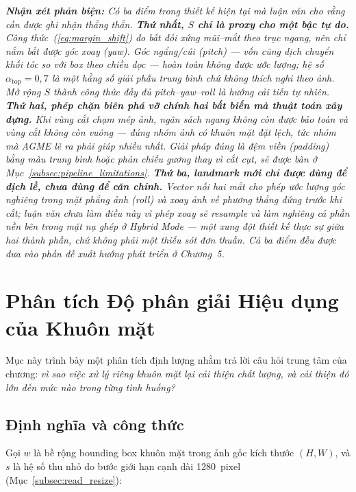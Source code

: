\medskip
\noindent\textit{\textbf{Nhận xét phản biện:} Có ba điểm trong thiết kế hiện tại mà luận văn cho rằng cần được ghi nhận thẳng thắn. \textbf{Thứ nhất, $S$ chỉ là proxy cho một bậc tự do.} Công thức~(\ref{eq:margin_shift}) đo bất đối xứng mũi--mắt theo trục ngang, nên chỉ nắm bắt được góc xoay (yaw). Góc ngẩng/cúi (pitch) --- vốn cũng dịch chuyển khối tóc so với box theo chiều dọc --- hoàn toàn không được ước lượng; hệ số $\alpha_{\text{top}} = 0{,}7$ là một hằng số giải phẫu trung bình chứ không thích nghi theo ảnh. Mở rộng $S$ thành công thức đầy đủ pitch--yaw--roll là hướng cải tiến tự nhiên. \textbf{Thứ hai, phép chặn biên phá vỡ chính hai bất biến mà thuật toán xây dựng.} Khi vùng cắt chạm mép ảnh, ngân sách ngang không còn được bảo toàn và vùng cắt không còn vuông --- đúng nhóm ảnh có khuôn mặt đặt lệch, tức nhóm mà AGME lẽ ra phải giúp nhiều nhất. Giải pháp đúng là đệm viền (padding) bằng màu trung bình hoặc phản chiếu gương thay vì cắt cụt, sẽ được bàn ở Mục~\ref{subsec:pipeline_limitations}. \textbf{Thứ ba, landmark mới chỉ được dùng để dịch lề, chưa dùng để căn chỉnh.} Vector nối hai mắt cho phép ước lượng góc nghiêng trong mặt phẳng ảnh (roll) và xoay ảnh về phương thẳng đứng trước khi cắt; luận văn chưa làm điều này vì phép xoay sẽ resample và làm nghiêng cả phần nền bên trong mặt nạ ghép ở Hybrid Mode --- một xung đột thiết kế thực sự giữa hai thành phần, chứ không phải một thiếu sót đơn thuần. Cả ba điểm đều được đưa vào phần đề xuất hướng phát triển ở Chương~5.}

\section{Phân tích Độ phân giải Hiệu dụng của Khuôn mặt}
\label{sec:effective_resolution}

Mục này trình bày một phân tích định lượng nhằm trả lời câu hỏi trung tâm của chương: \textit{vì sao việc xử lý riêng khuôn mặt lại cải thiện chất lượng, và cải thiện đó lớn đến mức nào trong từng tình huống?}

\subsection{Định nghĩa và công thức}
\label{subsec:eff_res_formula}

Gọi $w$ là bề rộng bounding box khuôn mặt trong ảnh gốc kích thước $(H, W)$, và $s$ là hệ số thu nhỏ do bước giới hạn cạnh dài 1280~pixel (Mục~\ref{subsec:read_resize}):


